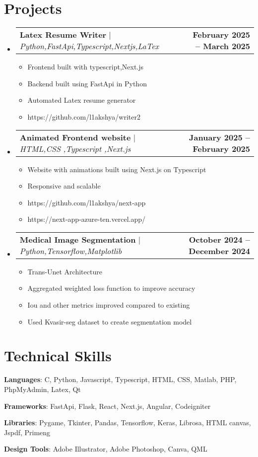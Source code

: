 \documentclass[letterpaper,11pt]{article}
\makeatletter
\newcommand{\resumeItem}[1]{
  \item\small{
    {#1 \vspace{-2pt}}
  }
}
\newcommand{\resumeProjectHeading}[2]{
    \item
    \begin{tabular*}{0.97\textwidth}{l@{\extracolsep{\fill}}r}
      \small#1 & \textbf{#2} \\
    \end{tabular*}\vspace{-7pt}
}
\newcommand{\resumeSubHeadingListStart}{\begin{itemize}[leftmargin=0.15in, label={}]}
\newcommand{\resumeSubHeadingListEnd}{\end{itemize}}
\newcommand{\resumeItemListStart}{\begin{itemize}}
\newcommand{\resumeItemListEnd}{\end{itemize}\vspace{-5pt}}
\makeatother
\begin{document}
\section{Projects}
    \resumeSubHeadingListStart
      \resumeProjectHeading
          {\textbf{Latex Resume Writer} $|$ \emph{Python,FastApi,Typescript,Nextjs,LaTex}}{February 2025 -- March 2025}
          \resumeItemListStart
            \resumeItem{Frontend built with typescript,Next.js}
            \resumeItem{Backend built using FastApi in Python}
            \resumeItem{Automated Latex resume generator}
            \resumeItem{https://github.com/l1akshya/writer2}
          \resumeItemListEnd
      \resumeProjectHeading
          {\textbf{Animated Frontend website} $|$ \emph{HTML,CSS ,Typescript ,Next.js}}{January 2025 -- February 2025}
          \resumeItemListStart
            \resumeItem{Website with animations built using Next.js on Typescript}
            \resumeItem{Responsive and scalable}
            \resumeItem{https://github.com/l1akshya/next-app}
            \resumeItem{https://next-app-azure-ten.vercel.app/}
          \resumeItemListEnd
      \resumeProjectHeading
          {\textbf{Medical Image Segmentation} $|$ \emph{Python,Tensorflow,Matplotlib}}{October 2024 -- December 2024}
          \resumeItemListStart
            \resumeItem{Trans-Unet Architecture}
            \resumeItem{Aggregated weighted loss function to improve accuracy}
            \resumeItem{Iou and other metrics improved compared to existing}
            \resumeItem{Used Kvasir-seg dataset to create segmentation model}
          \resumeItemListEnd
    \resumeSubHeadingListEnd

%
\section{Technical Skills}
  \begin{itemize}[leftmargin=0.15in, label={}]
    \small{\item{
     \textbf{Languages}{: C, Python, Javascript, Typescript, HTML, CSS, Matlab, PHP, PhpMyAdmin, Latex, Qt} 
    }}
    \small{\item{
     \textbf{Frameworks}{: FastApi, Flask, React, Next.js, Angular, Codeigniter} 
    }}
    \small{\item{
     \textbf{Libraries}{: Pygame, Tkinter, Pandas, Tensorflow, Keras, Librosa, HTML canvas, Jspdf, Primeng} 
    }}
    \small{\item{
     \textbf{Design Tools}{: Adobe Illustrator, Adobe Photoshop, Canva, QML} 
    }}
 \end{itemize}


\end{document}
